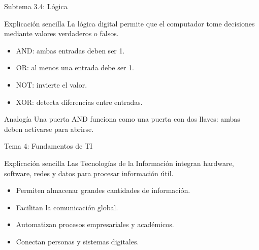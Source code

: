 \documentclass[10pt,aspectratio=169]{beamer}
\begin{document}
	\begin{frame}{Subtema 3.4: Lógica}
		
		\begin{block}{Explicación sencilla}
			La lógica digital permite que el computador tome decisiones mediante valores verdaderos o falsos.
		\end{block}
		
		\begin{itemize}
			\item AND: ambas entradas deben ser 1.
			\item OR: al menos una entrada debe ser 1.
			\item NOT: invierte el valor.
			\item XOR: detecta diferencias entre entradas.
		\end{itemize}
		
		\begin{block}{Analogía}
			Una puerta AND funciona como una puerta con dos llaves: ambas deben activarse para abrirse.
		\end{block}
		
	\end{frame}
	
	
	\begin{frame}{Tema 4: Fundamentos de TI}
		
		\begin{block}{Explicación sencilla}
			Las Tecnologías de la Información integran hardware, software, redes y datos para procesar información útil.
		\end{block}
		
		\begin{itemize}
			\item Permiten almacenar grandes cantidades de información.
			\item Facilitan la comunicación global.
			\item Automatizan procesos empresariales y académicos.
			\item Conectan personas y sistemas digitales.
		\end{itemize}
		
	\end{frame}
	
	
\end{document}

